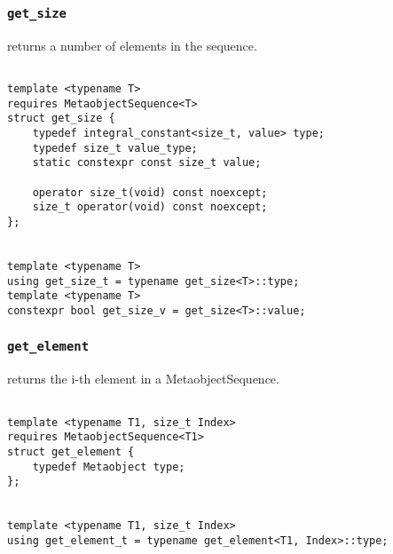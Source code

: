 
\subsubsection{\texttt{get\_size}}

returns a number of elements in the sequence.

\begin{verbatim}

template <typename T>
requires MetaobjectSequence<T>
struct get_size {
	typedef integral_constant<size_t, value> type;
	typedef size_t value_type;
	static constexpr const size_t value;

	operator size_t(void) const noexcept;
	size_t operator(void) const noexcept;
};


template <typename T>
using get_size_t = typename get_size<T>::type;
template <typename T>
constexpr bool get_size_v = get_size<T>::value;

\end{verbatim}

\subsubsection{\texttt{get\_element}}

returns the i-th element in a MetaobjectSequence.

\begin{verbatim}

template <typename T1, size_t Index>
requires MetaobjectSequence<T1>
struct get_element {
	typedef Metaobject type;
};


template <typename T1, size_t Index>
using get_element_t = typename get_element<T1, Index>::type;

\end{verbatim}
